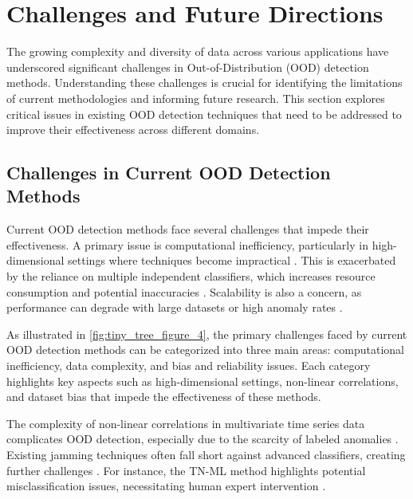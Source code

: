 \section{Challenges and Future Directions} \label{sec:Challenges and Future Directions}

The growing complexity and diversity of data across various applications have underscored significant challenges in Out-of-Distribution (OOD) detection methods. Understanding these challenges is crucial for identifying the limitations of current methodologies and informing future research. This section explores critical issues in existing OOD detection techniques that need to be addressed to improve their effectiveness across different domains.


\subsection{Challenges in Current OOD Detection Methods} \label{subsec:Challenges in Current OOD Detection Methods}

Current OOD detection methods face several challenges that impede their effectiveness. A primary issue is computational inefficiency, particularly in high-dimensional settings where techniques become impractical \cite{zhao2021suodacceleratinglargescaleunsupervised}. This is exacerbated by the reliance on multiple independent classifiers, which increases resource consumption and potential inaccuracies \cite{Out-of-Dis1}. Scalability is also a concern, as performance can degrade with large datasets or high anomaly rates \cite{li2021automateddataengineeringpipeline}. 

As illustrated in \autoref{fig:tiny_tree_figure_4}, the primary challenges faced by current OOD detection methods can be categorized into three main areas: computational inefficiency, data complexity, and bias and reliability issues. Each category highlights key aspects such as high-dimensional settings, non-linear correlations, and dataset bias that impede the effectiveness of these methods.

The complexity of non-linear correlations in multivariate time series data complicates OOD detection, especially due to the scarcity of labeled anomalies \cite{li2019anomalydetectiongenerativeadversarial}. Existing jamming techniques often fall short against advanced classifiers, creating further challenges \cite{kim2020make5gcommunicationsinvisible}. For instance, the TN-ML method highlights potential misclassification issues, necessitating human expert intervention \cite{an2023intelligentdiagnosticschemelung}.

